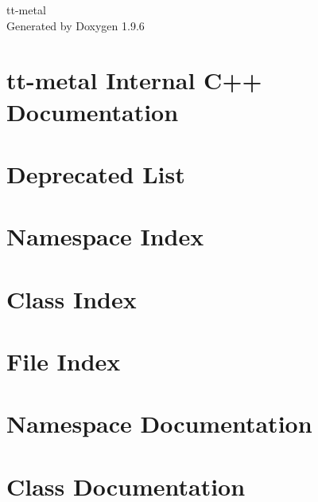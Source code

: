 \documentclass[twoside]{book}
\newcommand{\+}{\discretionary{\mbox{\scriptsize$\hookleftarrow$}}{}{}}
\newcommand{\clearemptydoublepage}{%
    \newpage{\pagestyle{empty}\cleardoublepage}%
  }
\begin{document}
  \raggedbottom
    \hypersetup{pageanchor=false,
                bookmarksnumbered=true,
                pdfencoding=unicode
               }
  \begin{titlepage}
  \vspace*{7cm}
  \begin{center}%
  {\Large tt-\/metal}\\
  \vspace*{1cm}
  {\large Generated by Doxygen 1.9.6}\\
  \end{center}
  \end{titlepage}
  \clearemptydoublepage
  \tableofcontents
  \clearemptydoublepage
  \hypersetup{pageanchor=true}
\chapter{tt-\/metal Internal C++ Documentation}
\label{index}\hypertarget{index}{}
\chapter{Deprecated List}
\label{deprecated}

\chapter{Namespace Index}

\chapter{Class Index}

\chapter{File Index}

\chapter{Namespace Documentation}






\chapter{Class Documentation}











\end{document}
